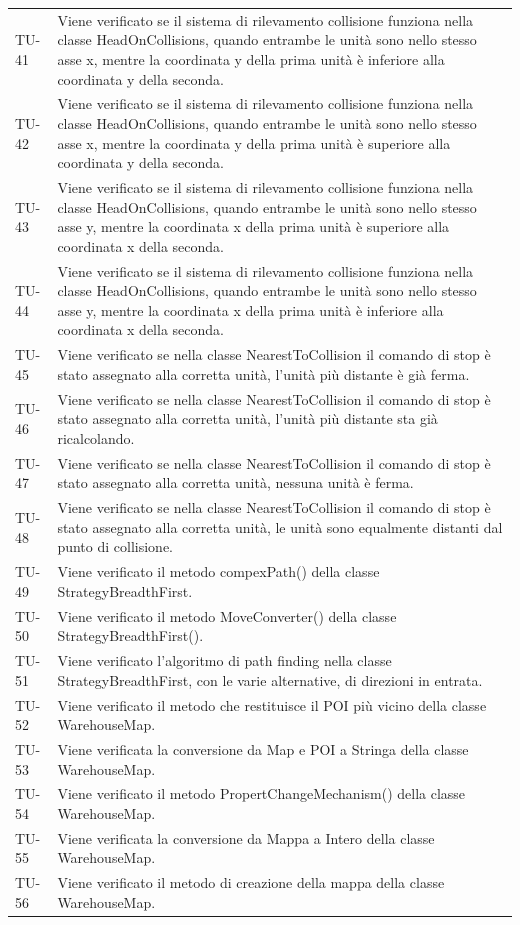 \begin{longtable}{ >{\centering}p{} >{}p{}}
	TU-41 & Viene verificato se il sistema di rilevamento collisione funziona nella classe HeadOnCollisions, quando entrambe le unità sono nello stesso asse x, mentre la coordinata y della prima unità è inferiore alla coordinata y della seconda. \tabularnewline
	TU-42 & Viene verificato se il sistema di rilevamento collisione funziona nella classe HeadOnCollisions, quando entrambe le unità sono nello stesso asse x, mentre la coordinata y della prima unità è superiore alla coordinata y della seconda. \tabularnewline
	TU-43 & Viene verificato se il sistema di rilevamento collisione funziona nella classe HeadOnCollisions, quando entrambe le unità sono nello stesso asse y, mentre la coordinata x della prima unità è superiore alla coordinata x della seconda. \tabularnewline
	TU-44 & Viene verificato se il sistema di rilevamento collisione funziona nella classe HeadOnCollisions, quando entrambe le unità sono nello stesso asse y, mentre la coordinata x della prima unità è inferiore alla coordinata x della seconda. \tabularnewline
	TU-45 & Viene verificato se nella classe NearestToCollision il comando di stop è stato assegnato alla corretta unità, l'unità più distante è già ferma. \tabularnewline
	TU-46 & Viene verificato se nella classe NearestToCollision il comando di stop è stato assegnato alla corretta unità, l'unità più distante sta già ricalcolando. \tabularnewline
	TU-47 & Viene verificato se nella classe NearestToCollision il comando di stop è stato assegnato alla corretta unità, nessuna unità è ferma. \tabularnewline
	TU-48 & Viene verificato se nella classe NearestToCollision il comando di stop è stato assegnato alla corretta unità, le unità sono equalmente distanti dal punto di collisione. \tabularnewline
	TU-49 & Viene verificato il metodo compexPath() della classe StrategyBreadthFirst. \tabularnewline
	TU-50 & Viene verificato il metodo MoveConverter() della classe StrategyBreadthFirst(). \tabularnewline
	TU-51 & Viene verificato l'algoritmo di path finding nella classe StrategyBreadthFirst, con le varie alternative, di direzioni in entrata. \tabularnewline
	TU-52 & Viene verificato il metodo che restituisce il POI più vicino della classe WarehouseMap. \tabularnewline
	TU-53 & Viene verificata la conversione da Map e POI a Stringa della classe WarehouseMap. \tabularnewline
	TU-54 & Viene verificato il metodo PropertChangeMechanism() della classe WarehouseMap. \tabularnewline
	TU-55 & Viene verificata la conversione da Mappa a Intero della classe WarehouseMap. \tabularnewline
	TU-56 & Viene verificato il metodo di creazione della mappa della classe WarehouseMap. \tabularnewline

\end{longtable}

